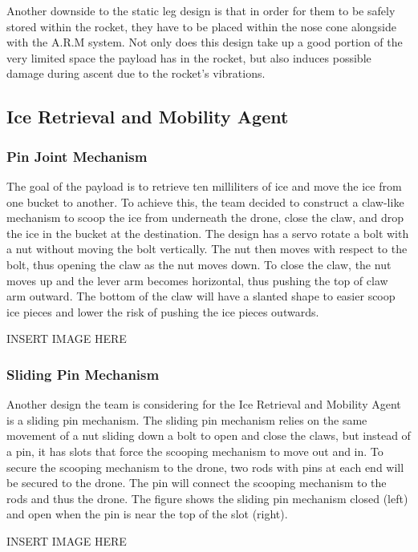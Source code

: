 			Another downside to the static leg design is that in order for them to be safely stored within the rocket, they have to be placed within the nose cone alongside with the A.R.M system. Not only does this design take up a good portion of the very limited space the payload has in the rocket, but also induces possible damage during ascent due to the rocket’s vibrations.  
		

	\subsection{Ice Retrieval and Mobility Agent}
		\subsubsection{Pin Joint Mechanism}
			The goal of the payload is to retrieve ten milliliters of ice and move the ice from one bucket to another. To achieve this, the team decided to construct a claw-like mechanism to scoop the ice from underneath the drone, close the claw, and drop the ice in the bucket at the destination. The design has a servo rotate a bolt with a nut without moving the bolt vertically. The nut then moves with respect to the bolt, thus opening the claw as the nut moves down. To close the claw, the nut moves up and the lever arm becomes horizontal, thus pushing the top of claw arm outward. The bottom of the claw will have a slanted shape to easier scoop ice pieces and lower the risk of pushing the ice pieces outwards. 

			INSERT IMAGE HERE

		\subsubsection{Sliding Pin Mechanism}
			Another design the team is considering for the Ice Retrieval and Mobility Agent is a sliding pin mechanism. The sliding pin mechanism relies on the same movement of a nut sliding down a bolt to open and close the claws, but instead of a pin, it has slots that force the scooping mechanism to move out and in. To secure the scooping mechanism to the drone, two rods with pins at each end will be secured to the drone. The pin will connect the scooping mechanism to the rods and thus the drone. The figure shows the sliding pin mechanism closed (left) and open when the pin is near the top of the slot (right). 

			INSERT IMAGE HERE

